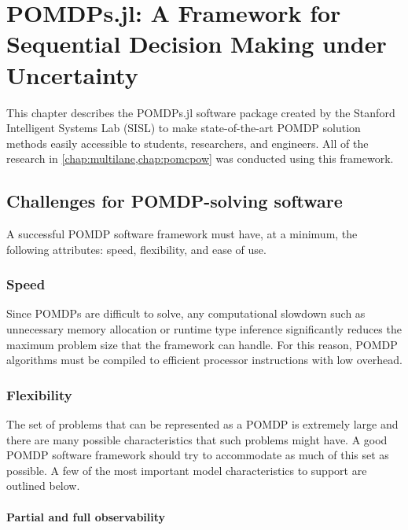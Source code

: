 \chapter{POMDPs.jl: A Framework for Sequential Decision Making under Uncertainty} \label{chap:pomdpsjl}

This chapter describes the POMDPs.jl software package created by the Stanford Intelligent Systems Lab (SISL) to make state-of-the-art POMDP solution methods easily accessible to students, researchers, and engineers.
All of the research in \cref{chap:multilane,chap:pomcpow} was conducted using this framework.


\section{Challenges for POMDP-solving software}

A successful POMDP software framework must have, at a minimum, the following attributes: speed, flexibility, and ease of use.

\subsection{Speed}

Since POMDPs are difficult to solve, any computational slowdown such as unnecessary memory allocation or runtime type inference significantly reduces the maximum problem size that the framework can handle.
For this reason, POMDP algorithms must be compiled to efficient processor instructions with low overhead.

\subsection{Flexibility}

The set of problems that can be represented as a POMDP is extremely large and there are many possible characteristics that such problems might have.
A good POMDP software framework should try to accommodate as much of this set as possible.
A few of the most important model characteristics to support are outlined below.

\subsubsection{Partial and full observability}

